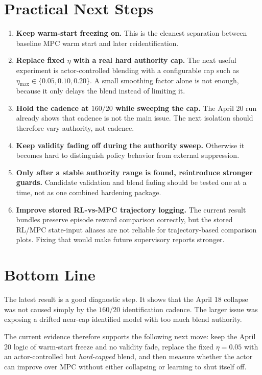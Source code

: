 \documentclass[11pt]{article}
\begin{document}
\section*{Practical Next Steps}
\begin{enumerate}
\item \textbf{Keep warm-start freezing on.}
This is the cleanest separation between baseline MPC warm start and later reidentification.

\item \textbf{Replace fixed $\eta$ with a real hard authority cap.}
The next useful experiment is actor-controlled blending with a configurable cap such as $\eta_{\max}\in\{0.05,0.10,0.20\}$. A small smoothing factor alone is not enough, because it only delays the blend instead of limiting it.

\item \textbf{Hold the cadence at $160/20$ while sweeping the cap.}
The April 20 run already shows that cadence is not the main issue. The next isolation should therefore vary authority, not cadence.

\item \textbf{Keep validity fading off during the authority sweep.}
Otherwise it becomes hard to distinguish policy behavior from external suppression.

\item \textbf{Only after a stable authority range is found, reintroduce stronger guards.}
Candidate validation and blend fading should be tested one at a time, not as one combined hardening package.

\item \textbf{Improve stored RL-vs-MPC trajectory logging.}
The current result bundles preserve episode reward comparison correctly, but the stored RL/MPC state-input aliases are not reliable for trajectory-based comparison plots. Fixing that would make future supervisory reports stronger.
\end{enumerate}

\section*{Bottom Line}
The latest result is a good diagnostic step. It shows that the April 18 collapse was not caused simply by the $160/20$ identification cadence. The larger issue was exposing a drifted near-cap identified model with too much blend authority.

The current evidence therefore supports the following next move: keep the April 20 logic of warm-start freeze and no validity fade, replace the fixed $\eta=0.05$ with an actor-controlled but \emph{hard-capped} blend, and then measure whether the actor can improve over MPC without either collapsing or learning to shut itself off.
\end{document}
